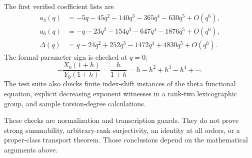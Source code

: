 \documentclass[11pt,letterpaper]{article}
\theoremstyle{definition}
\begin{document}
The first verified coefficient lists are
\begin{align*}
 a_4(q)&=-5q-45q^2-140q^3-365q^4-630q^5+O(q^6),\\
 a_6(q)&=-q-23q^2-154q^3-647q^4-1876q^5+O(q^6),\\
 \Delta(q)&=q-24q^2+252q^3-1472q^4+4830q^5+O(q^6).
\end{align*}
The formal-parameter sign is checked at $q=0$:
\[
 -\frac{X_0(1+h)}{Y_0(1+h)}=\frac{h}{1+h}
                =h-h^2+h^3-h^4+\cdots.
\]
The test suite also checks finite index-shift instances of the theta
functional equation, explicit decreasing exponent witnesses in a
rank-two lexicographic group, and sample torsion-degree calculations.

These checks are normalization and transcription guards. They do not
prove strong summability, arbitrary-rank surjectivity, an identity at
all orders, or a proper-class transport theorem. Those conclusions
depend on the mathematical arguments above.
\end{document}

